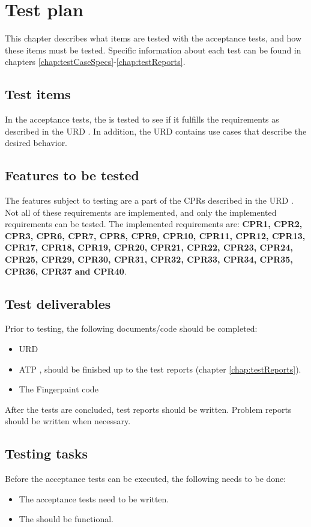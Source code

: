 \chapter{Test plan}
\label{chap:testPlan}
This chapter describes what items are tested with the acceptance tests, and how these items must be tested. Specific information about each test can be found in chapters \ref{chap:testCaseSpecs}-\ref{chap:testReports}.

\section{Test items}
In the acceptance tests, the \applicationname{} is tested to see if it fulfills the requirements as described in the URD \cite{urd}. In addition, the URD \cite{urd} contains use cases that describe the desired behavior.

\section{Features to be tested}
The features subject to testing are a part of the CPRs described in the URD \cite{urd}. Not all of these requirements are implemented, and only the implemented requirements can be tested. The implemented requirements are: \textbf{CPR1, CPR2, CPR3, CPR6, CPR7, CPR8, CPR9, CPR10, CPR11, CPR12, CPR13, CPR17, CPR18, CPR19, CPR20, CPR21, CPR22, CPR23, CPR24, CPR25, CPR29, CPR30, CPR31, CPR32, CPR33, CPR34, CPR35, CPR36, CPR37 and CPR40}.

\section{Test deliverables}
Prior to testing, the following documents/code should be completed:
\begin{itemize}
\item URD \cite{urd}
\item ATP \cite{atp}, should be finished up to the test reports (chapter \ref{chap:testReports}).
\item The Fingerpaint code
\end{itemize}
After the tests are concluded, test reports should be written. Problem reports should be written when necessary.

\section{Testing tasks}
Before the acceptance tests can be executed, the following needs to be done:
\begin{itemize}
\item The acceptance tests need to be written.
\item The \applicationname{} should be functional.
\end{itemize}

